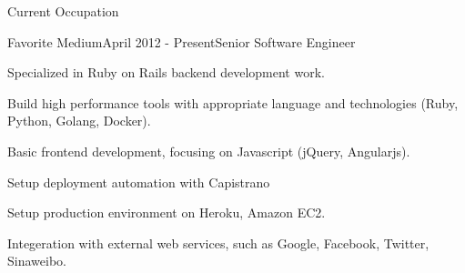 \documentclass{resume} %
\begin{document}
\begin{rSection}{Current Occupation}

\begin{rSubsection}{Favorite Medium}{April 2012 - Present}{Senior Software Engineer}{}{}
\begin{rSubsectionList}
\item Specialized in Ruby on Rails backend development work.
\item Build high performance tools with appropriate language and technologies (Ruby, Python, Golang, Docker).
\item Basic frontend development, focusing on Javascript (jQuery, Angularjs).
\item Setup deployment automation with Capistrano
\item Setup production environment on Heroku, Amazon EC2.
\item Integeration with external web services, such as Google, Facebook, Twitter, Sinaweibo.
\end{rSubsectionList}
\end{rSubsection}
\end{rSection}
\end{document}
